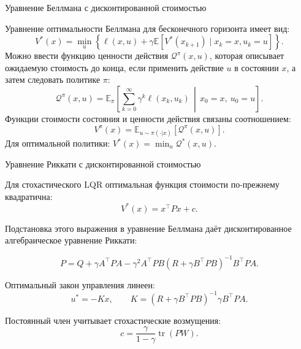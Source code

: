 \documentclass{beamer}
\begin{document}
	\begin{frame}{Уравнение Беллмана с дисконтированной стоимостью}
		\begin{flushleft}
			
			Уравнение оптимальности Беллмана для бесконечного горизонта имеет вид:
			\[
			V^*(x)=
			\min_u\left\{
			\ell(x,u)+
			\gamma\mathbb{E}\left[
			V^*(x_{k+1})\mid x_k=x,u_k=u
			\right]
			\right\}.
			\]
			Можно ввести функцию ценности действия $\mathcal{Q}^\pi(x,u)$,
			которая описывает ожидаемую стоимость до конца, если применить действие $u$
			в состоянии $x$, а затем следовать политике $\pi$:
			\[
			\mathcal{Q}^\pi(x,u)=
			\mathbb{E}_\pi\left[
			\sum_{k=0}^{\infty}\gamma^k\ell(x_k,u_k)
			\,\middle|\,
			x_0=x,\ u_0=u
			\right].
			\]
			Функции стоимости состояния и ценности действия связаны соотношением:
			\[
			V^\pi(x)=
			\mathbb{E}_{u\sim\pi(\cdot|x)}
			[\mathcal{Q}^\pi(x,u)].
			\]
			Для оптимальной политики: $V^*(x)=\min_u \mathcal{Q}^*(x,u).$
		\end{flushleft}
	\end{frame}
	
	
	\begin{frame}{Уравнение Риккати с дисконтированной стоимостью}
		\begin{flushleft}
			
			Для стохастического LQR оптимальная функция стоимости по-прежнему квадратична:
			\[
			V^*(x)=x^\top Px+c.
			\]
			
			Подстановка этого выражения в уравнение Беллмана даёт
			дисконтированное алгебраическое уравнение Риккати:
			
			\[
			P=Q+\gamma A^\top PA
			-\gamma^2 A^\top PB
			(R+\gamma B^\top PB)^{-1}
			B^\top PA.
			\]
			
			Оптимальный закон управления линеен:
			\[
			u^*=-Kx,\qquad
			K=(R+\gamma B^\top PB)^{-1}
			\gamma B^\top PA.
			\]
			
			Постоянный член учитывает стохастические возмущения:
			\[
			c=\frac{\gamma}{1-\gamma}
			\operatorname{tr}(PW).
			\]
			
		\end{flushleft}
	\end{frame}
	
	
	
\end{document}
